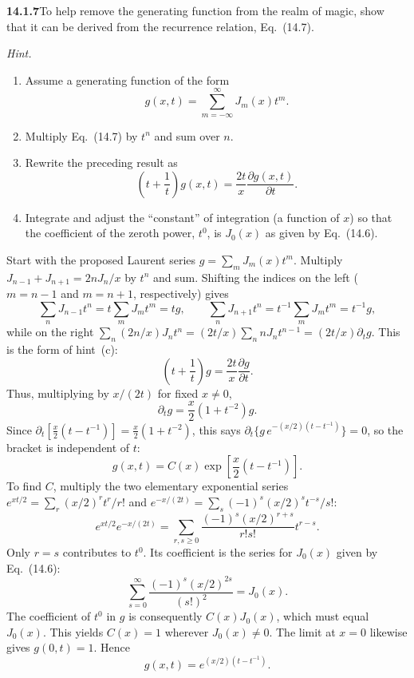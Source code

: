 \par\bigskip
\noindent\textbf{14.1.7}\quad To help remove the generating function from
the realm of magic, show that it can be derived from the recurrence
relation, Eq.~(14.7).
\par\emph{Hint.}
\begin{enumerate}
\item[(a)] Assume a generating function of the form
\[
g(x,t)=\sum_{m=-\infty}^{\infty}J_{m}(x)t^{m}.
\]
\item[(b)] Multiply Eq.~(14.7) by $t^{n}$ and sum over $n$.
\item[(c)] Rewrite the preceding result as
\[
\left(t+\frac{1}{t}\right)g(x,t)=\frac{2t}{x}\frac{\partial g(x,t)}{\partial t}.
\]
\item[(d)] Integrate and adjust the ``constant'' of integration (a
function of $x$) so that the coefficient of the zeroth power, $t^{0}$,
is $J_{0}(x)$ as given by Eq.~(14.6).
\end{enumerate}
\solution
Start with the proposed Laurent series $g=\sum_mJ_m(x)t^m$.
Multiply $J_{n-1}+J_{n+1}=2nJ_n/x$ by $t^n$ and sum. Shifting the
indices on the left ($m=n-1$ and $m=n+1$, respectively) gives
\[
\sum_nJ_{n-1}t^n=t\sum_mJ_mt^m=tg,\qquad
\sum_nJ_{n+1}t^n=t^{-1}\sum_mJ_mt^m=t^{-1}g,
\]
while on the right
$\sum_n(2n/x)J_nt^n=(2t/x)\sum_nnJ_nt^{n-1}=(2t/x)\partial_tg$.
This is the form of hint~(c):
\[
\left(t+\frac1t\right)g=\frac{2t}{x}\frac{\partial g}{\partial t}.
\]
Thus, multiplying by $x/(2t)$ for fixed $x\ne0$,
\[
\partial_tg=\frac x2(1+t^{-2})g.
\]
Since $\partial_t[\frac x2(t-t^{-1})]=\frac x2(1+t^{-2})$, this says
$\partial_t\{g\,e^{-(x/2)(t-t^{-1})}\}=0$, so the bracket is
independent of $t$:
\[
g(x,t)=C(x)\exp\left[\frac x2(t-t^{-1})\right].
\]
To find $C$, multiply the two elementary exponential series
$e^{xt/2}=\sum_r(x/2)^rt^r/r!$ and
$e^{-x/(2t)}=\sum_s(-1)^s(x/2)^st^{-s}/s!$:
\[
e^{xt/2}e^{-x/(2t)}
=\sum_{r,s\ge0}\frac{(-1)^s(x/2)^{r+s}}{r!s!}t^{r-s}.
\]
Only $r=s$ contributes to $t^0$. Its coefficient is the series for
$J_0(x)$ given by Eq.~(14.6):
\[
\sum_{s=0}^{\infty}\frac{(-1)^s(x/2)^{2s}}{(s!)^2}=J_0(x).
\]
The coefficient of $t^0$ in $g$ is consequently $C(x)J_0(x)$,
which must equal $J_0(x)$. This yields $C(x)=1$ wherever $J_0(x)\ne0$.
The limit at $x=0$ likewise gives $g(0,t)=1$. Hence
\[
\boxed{g(x,t)=e^{(x/2)(t-t^{-1})}.}
\]

